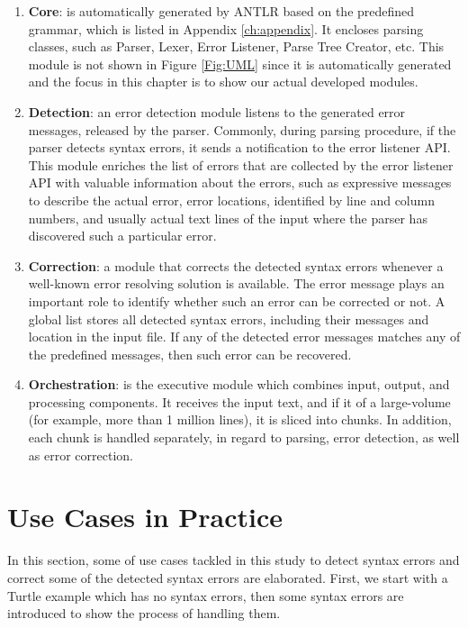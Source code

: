 \begin{enumerate}[]
 \item \textbf {Core}: is automatically generated by ANTLR based on the predefined grammar, which is listed in Appendix \ref{ch:appendix}. 
 It encloses parsing classes, such as Parser, Lexer, Error Listener, Parse Tree Creator, etc. This module is not shown in Figure \ref{Fig:UML} since it is automatically generated and the focus in this chapter is to show our actual developed modules. 
\item \textbf{Detection}: an error detection module listens to the generated error messages, released by the parser. 
Commonly, during parsing procedure, if the parser detects syntax errors, it sends a notification to the error listener API. 
This module enriches the list of errors that are collected by the error listener API with valuable information about the errors, such as  expressive messages to describe the actual error,  error locations, identified by line and column numbers, and usually  actual text lines  of the input where the parser has discovered such a particular error.

\item \textbf {Correction}: a module that corrects the detected syntax errors whenever a well-known error resolving solution is available. 
The error message plays an important role to identify whether such an error can be corrected or not. 
A global list stores all detected syntax errors, including their messages and location in the input file. 
If any of the detected error messages matches any of the predefined messages, then such error can be recovered.

\item \textbf{Orchestration}: %
is the executive module which combines input, output, and processing components. 
It receives the input text, and if it of a large-volume (for example, more than 1 million lines), it is sliced into  chunks. In addition, each chunk is handled separately, in regard to parsing, error detection, as well as error correction.

\end{enumerate} 


\section{Use Cases in Practice}
In this section, some of use cases tackled in this study to detect syntax errors and correct some of the detected syntax errors are elaborated. 
First, we start with a Turtle example which has no syntax errors, then some syntax errors are introduced to show the process of handling them. 

